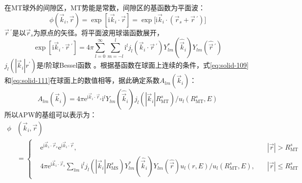 在MT球外的间隙区，MT势能是常数，间隙区的基函数为平面波：
\begin{equation}
	\phi(\vec k_i,\vec r)=\exp[\mathrm{i}\vec k_i\cdot\vec r]=\exp\big[\mathrm{i}\vec k_i\cdot(\vec r_s+\vec r\,^\prime)\big]
  \label{eq:solid-111}
\end{equation}
$\vec r\,^\prime$是以$\vec r_s$为原点的矢径。将平面波用球谐函数展开，
\begin{equation}
	\exp[\mathrm{i}\vec k_i\cdot\vec r\,^\prime]=4\pi\sum_{l=0}^{\infty}\sum_{m=-l}^l\mathrm{i}^lj_l(\vec k_i\cdot\vec r\,^\prime)Y_{lm}^{\ast}(\hat{\vec k}_i)Y_{lm}(\hat{\vec r}\,^\prime)
  \label{eq:solid-112}
\end{equation}
$j_l(|\vec k_i|r^\prime)$是$l$阶球Bessel函数%
。根据基函数在球面上连续的条件，式\eqref{eq:solid-109}和\eqref{eq:solid-111}在球面上的数值相等，据此确定系数$A_{lm}(\vec k_i)$：
$$A_{lm}(\vec k_i)=4\pi\mathrm{e}^{\mathrm{i}\vec k_i\cdot\vec r_s}\mathrm{i}^lY_{lm}(\hat{\vec k}_i)j_l(|\vec k_i|R_{\mathrm{MT}}^s)/u_l(R_{\mathrm{MT}}^s,E)$$
所以APW的基组可以表示为：
\begin{equation}
  \begin{split}
    \phi&(\vec k_i,\vec r)\\
    &=\left\{\begin{aligned}
	    &\mathrm{e}^{\mathrm{i}\vec k_i\cdot\vec r_s}\mathrm{e}^{\mathrm{i}\vec k_i\cdot\vec r},&|\vec r|>R_{\mathrm{MT}}^s\\
	    &4\pi\mathrm{e}^{\mathrm{i}\vec k_i\cdot\vec r_s}\sum_{lm}\mathrm{i}^lj_l(|\vec k_i|R_{\mathrm{MS}}^s)Y_{lm}^{\ast}(\hat{\vec k}_i)Y_{lm}(\hat{\vec r})u_l(r,E)/u_l(R_{\mathrm{MT}}^s,E),\quad&|\vec r|\leqslant R_{\mathrm{MT}}^s
    \end{aligned} \right.
  \end{split}
  \label{eq:solid-113}
\end{equation}

